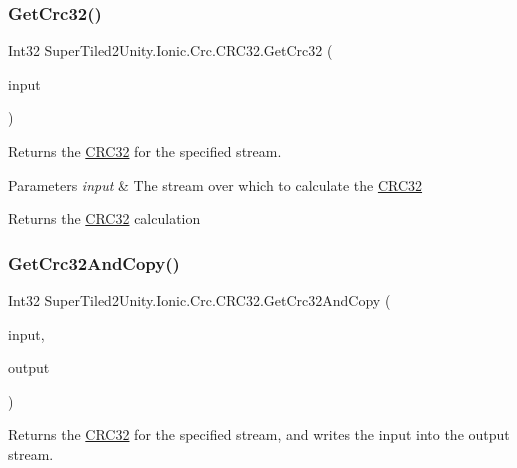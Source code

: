 \subsubsection{\texorpdfstring{Get\+Crc32()}{GetCrc32()}}
{\footnotesize\ttfamily Int32 Super\+Tiled2\+Unity.\+Ionic.\+Crc.\+C\+R\+C32.\+Get\+Crc32 (\begin{DoxyParamCaption}\item[{System.\+I\+O.\+Stream}]{input }\end{DoxyParamCaption})}



Returns the \mbox{\hyperlink{class_super_tiled2_unity_1_1_ionic_1_1_crc_1_1_c_r_c32}{C\+R\+C32}} for the specified stream. 


\begin{DoxyParams}{Parameters}
{\em input} & The stream over which to calculate the \mbox{\hyperlink{class_super_tiled2_unity_1_1_ionic_1_1_crc_1_1_c_r_c32}{C\+R\+C32}}\\
\hline
\end{DoxyParams}
\begin{DoxyReturn}{Returns}
the \mbox{\hyperlink{class_super_tiled2_unity_1_1_ionic_1_1_crc_1_1_c_r_c32}{C\+R\+C32}} calculation
\end{DoxyReturn}
\mbox{\label{class_super_tiled2_unity_1_1_ionic_1_1_crc_1_1_c_r_c32_a463a42082c0ed59d8e1c20e60c4e6d8d}} 
\subsubsection{\texorpdfstring{Get\+Crc32\+And\+Copy()}{GetCrc32AndCopy()}}
{\footnotesize\ttfamily Int32 Super\+Tiled2\+Unity.\+Ionic.\+Crc.\+C\+R\+C32.\+Get\+Crc32\+And\+Copy (\begin{DoxyParamCaption}\item[{System.\+I\+O.\+Stream}]{input,  }\item[{System.\+I\+O.\+Stream}]{output }\end{DoxyParamCaption})}



Returns the \mbox{\hyperlink{class_super_tiled2_unity_1_1_ionic_1_1_crc_1_1_c_r_c32}{C\+R\+C32}} for the specified stream, and writes the input into the output stream. 



